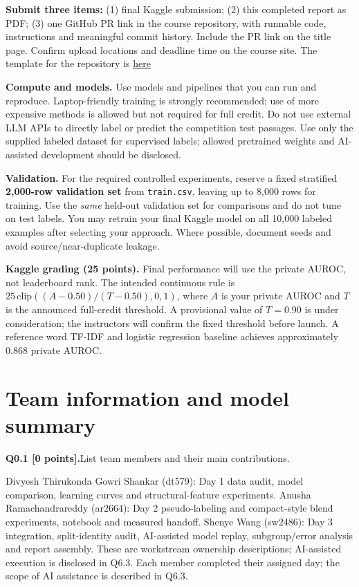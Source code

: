 \documentclass[11pt,letterpaper]{article}
\newcommand{\question}[2]{\needspace{4\baselineskip}\par\addvspace{0.45em}\noindent\textbf{#1}\quad #2\par\nobreak\vspace{0.1em}}
\begin{document}
\textbf{Submit three items:} (1) final Kaggle submission; (2) this completed report as PDF; (3) one GitHub PR link in the course repository, with runnable code, instructions and meaningful commit history. Include the PR link on the title page. Confirm upload locations and deadline time on the course site. The template for the repository is \href{https://github.com/sekhari/human-or-ai-submissions}{here}

\textbf{Compute and models.} Use models and pipelines that you can run and reproduce. Laptop-friendly training is strongly recommended; use of more expensive methods is allowed but not required for full credit. Do not use external LLM APIs to directly label or predict the competition test passages. Use only the supplied labeled dataset for supervised labels; allowed pretrained weights and AI-assisted development should be disclosed.

\textbf{Validation.} For the required controlled experiments, reserve a fixed stratified \textbf{2,000-row validation set} from \texttt{train.csv}, leaving up to 8,000 rows for training. Use the \emph{same} held-out validation set for comparisons and do not tune on test labels. You may retrain your final Kaggle model on all 10,000 labeled examples after selecting your approach. Where possible, document seeds and avoid source/near-duplicate leakage.

\textbf{Kaggle grading (25 points).} Final performance will use the private AUROC, not leaderboard rank. The intended continuous rule is $25\,\mathrm{clip}((A-0.50)/(T-0.50),0,1)$, where $A$ is your private AUROC and $T$ is the announced full-credit threshold. A provisional value of $T=0.90$ is under consideration; the instructors will confirm the fixed threshold before launch. A reference word TF-IDF and logistic regression baseline achieves approximately 0.868 private AUROC.

\section{Team information and model summary}
\question{Q0.1 [0 points].}{List team members and their main contributions.}

Divyesh Thirukonda Gowri Shankar (dt579): Day 1 data audit, model comparison, learning curves and structural-feature experiments. Anusha Ramachandrareddy (ar2664): Day 2 pseudo-labeling and compact-style blend experiments, notebook and measured handoff. Shenye Wang (sw2486): Day 3 integration, split-identity audit, AI-assisted model replay, subgroup/error analysis and report assembly. These are workstream ownership descriptions; AI-assisted execution is disclosed in Q6.3. Each member completed their assigned day; the scope of AI assistance is described in Q6.3.
\end{document}
